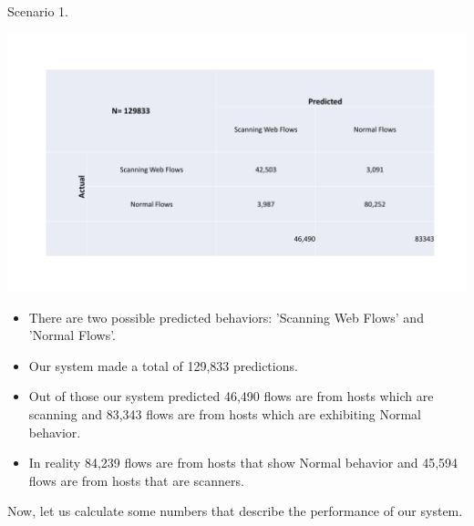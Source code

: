 \begin{table}[b]
	\caption{Scenario 1.}%
	\centerline{\includegraphics[scale = 0.5]{scenario1.pdf}}	
\end{table}

\begin{itemize}
	\item There are two possible predicted behaviors: 'Scanning Web Flows' and 'Normal Flows'. 
	\item Our system made a total of 129,833 predictions.
	\item Out of those our system predicted 46,490 flows are from hosts which are scanning and 83,343 flows are from hosts which are exhibiting Normal behavior.
	\item In reality 84,239 flows are from hosts that show Normal behavior and 45,594 flows are from hosts that are scanners.	
\end{itemize}

Now, let us calculate some numbers that describe the performance of our system.

